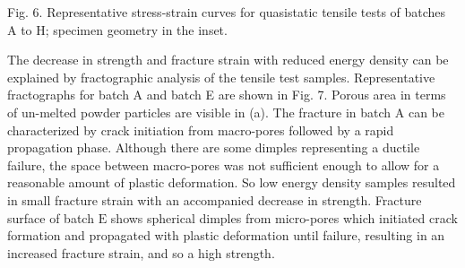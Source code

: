 \documentclass[10pt]{article}
\begin{document}
Fig. 6. Representative stress-strain curves for quasistatic tensile tests of batches A to $\mathrm{H}$; specimen geometry in the inset.

The decrease in strength and fracture strain with reduced energy density can be explained by fractographic analysis of the tensile test samples. Representative fractographs for batch A and batch E are shown in Fig. 7. Porous area in terms of un-melted powder particles are visible in (a). The fracture in batch A can be characterized by crack initiation from macro-pores followed by a rapid propagation phase. Although there are some dimples representing a ductile failure, the space between macro-pores was not sufficient enough to allow for a reasonable amount of plastic deformation. So low energy density samples resulted in small fracture strain with an accompanied decrease in strength. Fracture surface of batch $\mathrm{E}$ shows spherical dimples from micro-pores which initiated crack formation and propagated with plastic deformation until failure, resulting in an increased fracture strain, and so a high strength.
\end{document}
